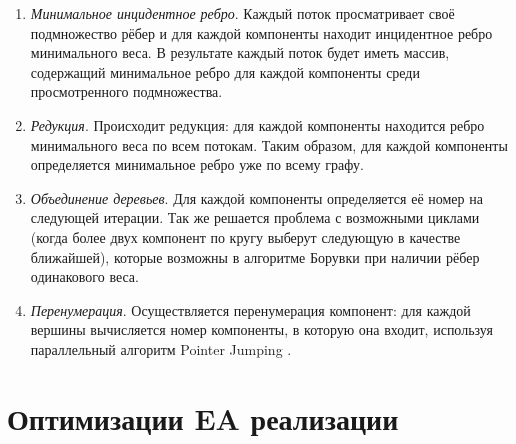 \documentclass{article}
\begin{document}
\begin{enumerate}
    \item \textit{Минимальное инцидентное ребро}.
          Каждый поток просматривает своё подмножество рёбер и для каждой компоненты находит инцидентное ребро минимального веса. 
          В результате каждый поток будет иметь массив, содержащий минимальное ребро для каждой компоненты среди просмотренного подмножества.
    \item \textit{Редукция}.
          Происходит редукция: для каждой компоненты находится ребро минимального веса по всем потокам. 
          Таким образом, для каждой компоненты определяется минимальное ребро уже по всему графу.
    \item \textit{Объединение деревьев}.
          Для каждой компоненты определяется её номер на следующей итерации.
          Так же решается проблема с возможными циклами (когда более двух компонент по кругу выберут следующую в качестве ближайшей), которые возможны в алгоритме Борувки при наличии рёбер одинакового веса.
    \item \textit{Перенумерация}.
          Осуществляется перенумерация компонент: для каждой вершины вычисляется номер компоненты, в которую она входит, используя параллельный алгоритм Pointer Jumping \cite{pointer-jumping}.
\end{enumerate}




\newpage
\section{Оптимизации EA реализации}
\end{document}
